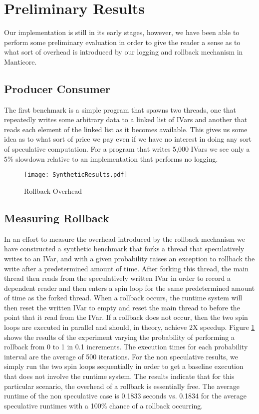 \section{Preliminary Results}
Our implementation is still in its early stages, however, we have been able to perform some preliminary evaluation in order to give the reader a sense as to what sort of overhead is introduced by our logging and rollback mechanism in Manticore.  

\subsection{Producer Consumer}
The first benchmark is a simple program that spawns two threads, one that repeatedly writes some arbitrary data to a linked list of IVars and another that reads each element of the linked list as it becomes available.  This gives us some idea as to what sort of price we pay even if we have no interest in doing any sort of speculative computation.  For a program that writes 5,000 IVars we see only a 5\% slowdown relative to an implementation that performs no logging.  

\begin{figure}
\texttt{[image: SyntheticResults.pdf]}
\caption{Rollback Overhead}
\label{synthetic}
\end{figure}

\subsection{Measuring Rollback}

In an effort to measure the overhead introduced by the rollback mechanism we have constructed a synthetic benchmark that forks a thread that speculatively writes to an IVar, and with a given probability raises an exception to rollback the write after a predetermined amount of time.  After forking this thread, the main thread then reads from the speculatively written IVar in order to record a dependent reader and then enters a spin loop for the same predetermined amount of time as the forked thread.  When a rollback occurs, the runtime system will then reset the written IVar to empty and reset the main thread to before the point that it read from the IVar.  If a rollback does not occur, then the two spin loops are executed in parallel and should, in theory, achieve 2X speedup.  Figure \ref{synthetic} shows the results of the experiment varying the probability of performing a rollback from 0 to 1 in 0.1 increments.  The execution times for each probability interval are the average of 500 iterations.  For the non speculative results, we simply run the two spin loops sequentially in order to get a baseline execution that does not involve the runtime system.  The results indicate that for this particular scenario, the overhead of a rollback is essentially free.  The average runtime of the non speculative case is 0.1833 seconds vs. 0.1834 for the average speculative runtimes with a 100\% chance of a rollback occurring.


